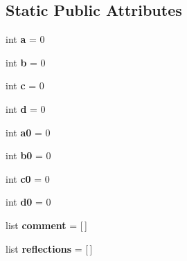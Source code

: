 \subsection*{Static Public Attributes}
\begin{DoxyCompactItemize}
\item 
\hypertarget{classJCPDS_1_1JCPDS_a9418ae33987e25bb6cff0c2de64f8b60}{int {\bfseries a} = 0}\label{classJCPDS_1_1JCPDS_a9418ae33987e25bb6cff0c2de64f8b60}

\item 
\hypertarget{classJCPDS_1_1JCPDS_a0a05ddd20692ac7885c02090c80ae9b2}{int {\bfseries b} = 0}\label{classJCPDS_1_1JCPDS_a0a05ddd20692ac7885c02090c80ae9b2}

\item 
\hypertarget{classJCPDS_1_1JCPDS_a48449d973d4dba83f73cf5da725a9616}{int {\bfseries c} = 0}\label{classJCPDS_1_1JCPDS_a48449d973d4dba83f73cf5da725a9616}

\item 
\hypertarget{classJCPDS_1_1JCPDS_a73e6b491c6ebf61ea16474472b57f1fd}{int {\bfseries d} = 0}\label{classJCPDS_1_1JCPDS_a73e6b491c6ebf61ea16474472b57f1fd}

\item 
\hypertarget{classJCPDS_1_1JCPDS_aaa0b2a4a0b3ca6a97ea2fc55c905c29f}{int {\bfseries a0} = 0}\label{classJCPDS_1_1JCPDS_aaa0b2a4a0b3ca6a97ea2fc55c905c29f}

\item 
\hypertarget{classJCPDS_1_1JCPDS_af88aaff23be0026b70e55f09a6e73acb}{int {\bfseries b0} = 0}\label{classJCPDS_1_1JCPDS_af88aaff23be0026b70e55f09a6e73acb}

\item 
\hypertarget{classJCPDS_1_1JCPDS_aba1a3a8c603a94e0b3ed6babbfd09734}{int {\bfseries c0} = 0}\label{classJCPDS_1_1JCPDS_aba1a3a8c603a94e0b3ed6babbfd09734}

\item 
\hypertarget{classJCPDS_1_1JCPDS_acc2fd1c621c0be8f860827f3006157ee}{int {\bfseries d0} = 0}\label{classJCPDS_1_1JCPDS_acc2fd1c621c0be8f860827f3006157ee}

\item 
\hypertarget{classJCPDS_1_1JCPDS_a0baef80c76433cded445041b5d0e29d5}{list {\bfseries comment} = \mbox{[}$\,$\mbox{]}}\label{classJCPDS_1_1JCPDS_a0baef80c76433cded445041b5d0e29d5}

\item 
\hypertarget{classJCPDS_1_1JCPDS_a4a667612a80191cc64ec7d06c27f4f84}{list {\bfseries reflections} = \mbox{[}$\,$\mbox{]}}\label{classJCPDS_1_1JCPDS_a4a667612a80191cc64ec7d06c27f4f84}


\end{DoxyCompactItemize}
